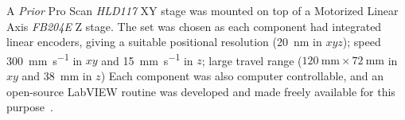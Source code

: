 A \emph{Prior} Pro Scan \textit{HLD117} XY stage was mounted on top of a Motorized Linear Axis \textit{FB204E} Z stage.
The set was chosen as each component had integrated linear encoders, giving a suitable positional resolution (\SI{20}{\nano\meter} in \(xyz\));
speed \SI{300}{\milli\meter\per\second} in \(xy\) and \SI{15}{\milli\meter\per\second} in \(z\);
large travel range (\(\SI{120}{\milli\meter} \times \SI{72}{\milli\meter} \) in \(xy\) and \SI{38}{\milli\meter} in \(z\))%
Each component was also computer controllable, and an open-source \gls{LabVIEW} routine was developed and made freely available for this purpose~\cite{russellSpimcontroller2017}.
%
%
